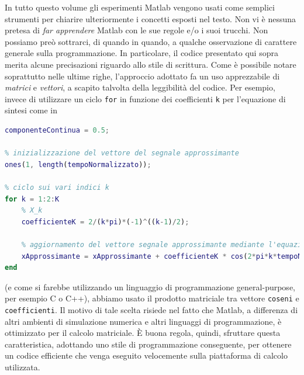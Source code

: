 \documentclass[12pt,oneside,openany]{memoir}
\numberwithin{equation}{subsection}
\begin{document}
In tutto questo volume gli esperimenti Matlab vengono usati come semplici strumenti per chiarire ulteriormente i concetti esposti nel testo. Non vi \`e nessuna pretesa di \textit{far apprendere} Matlab con le sue regole e/o i suoi trucchi. Non possiamo pre\`o sottrarci, di quando in quando, a qualche osservazione di carattere generale sulla programmazione. In particolare, il codice presentato qui sopra merita alcune precisazioni riguardo allo stile di scrittura. Come \`e possibile notare soprattutto nelle ultime righe, l'approccio adottato fa un uso apprezzabile di \textit{matrici} e \textit{vettori}, a scapito talvolta della leggibilit\`a del codice. Per esempio, invece di utilizzare un ciclo \texttt{for} in funzione dei coefficienti \texttt{k} per l'equazione di sintesi come in
\begin{lstlisting}[frame=single, language=Matlab]
% X_0 = 1/2
componenteContinua = 0.5;

% inizializzazione del vettore del segnale approssimante
ones(1, length(tempoNormalizzato));

% ciclo sui vari indici k
for k = 1:2:K
	% X_k
	coefficienteK = 2/(k*pi)*(-1)^((k-1)/2);
	
	% aggiornamento del vettore segnale approssimante mediante l'equazione di sintesi
	xApprossimante = xApprossimante + coefficienteK * cos(2*pi*k*tempoNormalizzato);
end
\end{lstlisting}
(e come si farebbe utilizzando un linguaggio di programmazione general-purpose, per esempio C o C++), abbiamo usato il prodotto matriciale tra vettore \texttt{coseni} e \texttt{coefficienti}. Il motivo di tale scelta risiede nel fatto che Matlab, a differenza di altri ambienti di simulazione numerica e altri linguaggi di programmazione, \`e ottimizzato per il calcolo matriciale. \`E buona regola, quindi, sfruttare questa caratteristica, adottando uno stile di programmazione conseguente, per ottenere un codice efficiente che venga eseguito velocemente sulla piattaforma di calcolo utilizzata.

\newpage
\end{document}
